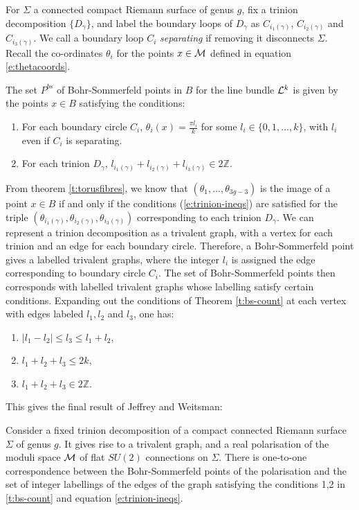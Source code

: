 	For $\Sigma$ a connected compact Riemann surface of genus $g$, fix a trinion decomposition $\{D_\gamma\}$, and label the boundary loops of $D_\gamma$ as $C_{i_1(\gamma)}$, $C_{i_2(\gamma)}$ and $C_{i_3(\gamma)}$. We call a boundary loop $C_i$ \emph{separating} if removing it disconnects $\Sigma$. Recall the co-ordinates $\theta_i$ for the points $x\in \mathcal{M}$ defined in equation \ref{e:thetacoords}. 
	\begin{theorem}
		\label{t:bs-count}
		The set $P^{bs}$ of Bohr-Sommerfeld points in $B$ for the line bundle $\mathcal{L}^k$ is given by the points $x\in B$ satisfying the conditions:
		\begin{enumerate}
			\item For each boundary circle $C_i$, $\theta_i(x) = \frac{\pi l_i}{k}$ for some $l_i \in \{0,1,...,k\}$, with $l_i$ even if $C_i$ is separating.
			\item For each trinion $D_\gamma$, $l_{i_1(\gamma)} + l_{i_2(\gamma)} + l_{i_3(\gamma)} \in 2\mathbb{Z}$.
		\end{enumerate}
	\end{theorem}
	From theorem \ref{t:torusfibres}, we know that $(\theta_1,...,\theta_{3g-3})$ is the image of a point $x\in B$ if and only if the conditions (\ref{e:trinion-ineqs}) are satisfied for the triple $(\theta_{i_1(\gamma)}, \theta_{i_2(\gamma)}, \theta_{i_3(\gamma)})$ corresponding to each trinion $D_\gamma$. We can represent a trinion decomposition as a trivalent graph, with a vertex for each trinion and an edge for each boundary circle. Therefore, a Bohr-Sommerfeld point gives a labelled trivalent graphs, where the integer $l_i$ is assigned the edge corresponding to boundary circle $C_i$. The set of Bohr-Sommerfeld points then corresponds with labelled trivalent graphs whose labelling satisfy certain conditions. Expanding out the conditions of Theorem \ref{t:bs-count} at each vertex with edges labeled $l_1,l_2$ and $l_3$, one has:
	\begin{enumerate}
		\item $|l_1-l_2| \leq l_3 \leq l_1+l_2$,
		\item $l_1+l_2+l_3 \leq 2k$,
		\item $l_1+l_2+l_3 \in 2\mathbb{Z}$.
	\end{enumerate}
	This gives the final result of Jeffrey and Weitsman:
	\begin{theorem}
		Consider a fixed trinion decomposition of a compact connected Riemann surface $\Sigma$ of genus $g$. It gives rise to a trivalent graph, and a real polarisation of the moduli space $\mathcal{M}$ of flat $SU(2)$ connections on $\Sigma$. There is one-to-one correspondence between the Bohr-Sommerfeld points of the polarisation and the set of integer labellings of the edges of the graph satisfying the conditions 1,2 in \ref{t:bs-count} and equation \ref{e:trinion-ineqs}.
	\end{theorem}

